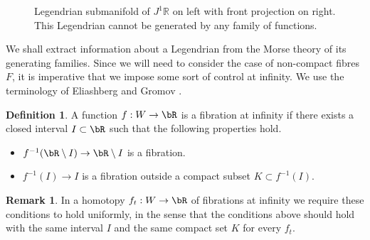\documentclass[JEP,XML,SOM,Unicode,NoFloatCountersInSection]{cedram}
\theoremstyle{plain}
\theoremstyle{definition}
\newtheorem{definition}[theorem]{Definition}
\newtheorem{remark}[theorem]{Remark}
\begin{document}
\begin{figure}[htbp]
\begin{center}
\caption{\smaller Legendrian submanifold of $J^1\mathbb R$ on left with front projection on right. This Legendrian cannot be generated by any family of functions.}
\label{FigLegendrian}
\end{center}
\end{figure}

We shall extract information about a Legendrian from the Morse theory of its generating families. Since we will need to consider the case of non-compact fibres $F$, it is imperative that we impose some sort of control at infinity. We use the terminology of Eliashberg and Gromov \cite{EG98}.

\begin{definition}\label{Definition: fibration at infinity}
A function $f:W \to \bR$ is a fibration at infinity if there exists a closed interval $I \subset \bR$ such that the following properties hold.
\begin{itemize}
\item $f^{-1}(\bR \setminus I) \to \bR \setminus I$ is a fibration.
\item $f^{-1}(I)\to I$ is a fibration outside a compact subset $K \subset f^{-1}(I)$.
\end{itemize}
\end{definition}

\begin{remark}\label{Remark: infinity family}
In a homotopy $f_t: W \to \bR$ of fibrations at infinity we require these conditions to hold uniformly, in the sense that the conditions above should hold with the same interval $I$ and the same compact set $K$ for every $f_t$.
\end{remark}
\end{document}
